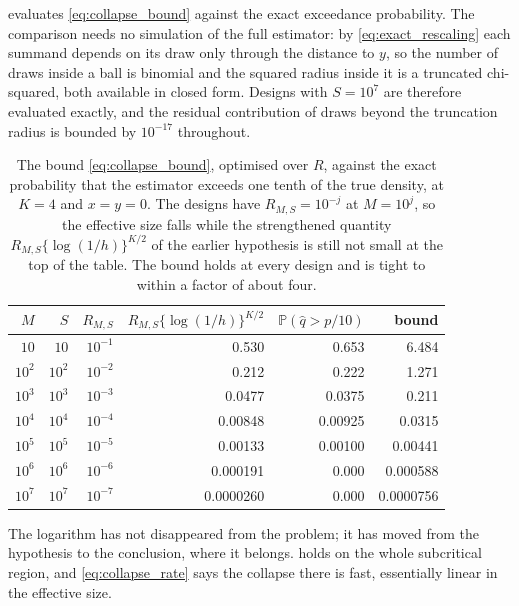 \documentclass[11pt]{article}
\theoremstyle{definition}
\newcommand{\Pp}{\mathbb{P}}
\begin{document}
 evaluates \eqref{eq:collapse_bound} against the exact exceedance probability. The comparison needs no simulation of the full estimator: by \eqref{eq:exact_rescaling} each summand depends on its draw only through the distance to $y$, so the number of draws inside a ball is binomial and the squared radius inside it is a truncated chi-squared, both available in closed form. Designs with $S=10^7$ are therefore evaluated exactly, and the residual contribution of draws beyond the truncation radius is bounded by $10^{-17}$ throughout.

\begin{table}[htbp]
\centering
\caption{The bound \eqref{eq:collapse_bound}, optimised over $R$, against the exact probability that the estimator exceeds one tenth of the true density, at $K=4$ and $x=y=0$. The designs have $R_{M,S}=10^{-j}$ at $M=10^{j}$, so the effective size falls while the strengthened quantity $R_{M,S}\{\log(1/h)\}^{K/2}$ of the earlier hypothesis is still not small at the top of the table. The bound holds at every design and is tight to within a factor of about four.}
\label{tab:collapse_bound}
\begin{tabular}{rrrrrr}
\toprule
$M$ & $S$ & $R_{M,S}$ & $R_{M,S}\{\log(1/h)\}^{K/2}$ & $\Pp(\widehat q>p/10)$ & bound \\
\midrule
$10$ & $10$ & $10^{-1}$ & 0.530 & 0.653 & 6.484 \\
$10^2$ & $10^2$ & $10^{-2}$ & 0.212 & 0.222 & 1.271 \\
$10^3$ & $10^3$ & $10^{-3}$ & 0.0477 & 0.0375 & 0.211 \\
$10^4$ & $10^4$ & $10^{-4}$ & 0.00848 & 0.00925 & 0.0315 \\
$10^5$ & $10^5$ & $10^{-5}$ & 0.00133 & 0.00100 & 0.00441 \\
$10^6$ & $10^6$ & $10^{-6}$ & 0.000191 & 0.000 & 0.000588 \\
$10^7$ & $10^7$ & $10^{-7}$ & 0.0000260 & 0.000 & 0.0000756 \\
\bottomrule
\end{tabular}
\end{table}

\FloatBarrier
The logarithm has not disappeared from the problem; it has moved from the hypothesis to the conclusion, where it belongs.  holds on the whole subcritical region, and \eqref{eq:collapse_rate} says the collapse there is fast, essentially linear in the effective size.
\end{document}
